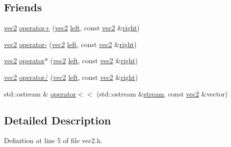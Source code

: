 \subsection*{Friends}
\begin{DoxyCompactItemize}
\item 
\hyperlink{structu__engine_1_1maths_1_1vec2}{vec2} \hyperlink{structu__engine_1_1maths_1_1vec2_acbbd9fb82f40deeca3b6fbfcdb3baa30}{operator+} (\hyperlink{structu__engine_1_1maths_1_1vec2}{vec2} \hyperlink{glew_8h_a6358510bdde486b81c7951ee5c470ee4}{left}, const \hyperlink{structu__engine_1_1maths_1_1vec2}{vec2} \&\hyperlink{glew_8h_a18826d74cd7b4e758c25b4ba66e20be2}{right})
\item 
\hyperlink{structu__engine_1_1maths_1_1vec2}{vec2} \hyperlink{structu__engine_1_1maths_1_1vec2_adfffcea694a076d10b3b734c0c149062}{operator-\/} (\hyperlink{structu__engine_1_1maths_1_1vec2}{vec2} \hyperlink{glew_8h_a6358510bdde486b81c7951ee5c470ee4}{left}, const \hyperlink{structu__engine_1_1maths_1_1vec2}{vec2} \&\hyperlink{glew_8h_a18826d74cd7b4e758c25b4ba66e20be2}{right})
\item 
\hyperlink{structu__engine_1_1maths_1_1vec2}{vec2} \hyperlink{structu__engine_1_1maths_1_1vec2_a54f52eaceb5eb993f9d3960e55b866a7}{operator$\ast$} (\hyperlink{structu__engine_1_1maths_1_1vec2}{vec2} \hyperlink{glew_8h_a6358510bdde486b81c7951ee5c470ee4}{left}, const \hyperlink{structu__engine_1_1maths_1_1vec2}{vec2} \&\hyperlink{glew_8h_a18826d74cd7b4e758c25b4ba66e20be2}{right})
\item 
\hyperlink{structu__engine_1_1maths_1_1vec2}{vec2} \hyperlink{structu__engine_1_1maths_1_1vec2_a73f8d7dee179a44d9f7e23c167467088}{operator/} (\hyperlink{structu__engine_1_1maths_1_1vec2}{vec2} \hyperlink{glew_8h_a6358510bdde486b81c7951ee5c470ee4}{left}, const \hyperlink{structu__engine_1_1maths_1_1vec2}{vec2} \&\hyperlink{glew_8h_a18826d74cd7b4e758c25b4ba66e20be2}{right})
\item 
std\+::ostream \& \hyperlink{structu__engine_1_1maths_1_1vec2_a840ecb00134864b59939ed0c556dce84}{operator$<$$<$} (std\+::ostream \&\hyperlink{glew_8h_a10d3bc96cdfc1d478f52c13d5ffd9316}{stream}, const \hyperlink{structu__engine_1_1maths_1_1vec2}{vec2} \&vector)
\end{DoxyCompactItemize}


\subsection{Detailed Description}


Definition at line 5 of file vec2.\+h.



